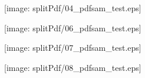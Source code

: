 \documentclass[portrait,a0c,final]{a0poster}
\newenvironment{poster}{
  \begin{center}
  \begin{minipage}[c]{0.99\textwidth}
}{
  \end{minipage} 
  \end{center}
}
\newenvironment{pcolumn}[1]{
  \begin{minipage}{#1\textwidth}
  \begin{center}
}{
  \end{center}
  \end{minipage}
}
\newcommand{\pbox}[4]{
\psshadowbox[#3]{
\begin{minipage}[t][#2][t]{#1}
#4
\end{minipage}
}}
\begin{document}
\begin{poster}
\begin{multicols}{2}
\begin{pcolumn}{0.5}
\texttt{[image: splitPdf/04\_pdfsam\_test.eps]}    
\end{pcolumn}

 \end{multicols}

 \begin{multicols}{3}

\begin{pcolumn}{0.33}
\texttt{[image: splitPdf/06\_pdfsam\_test.eps]}

\end{pcolumn}

\begin{pcolumn}{0.33}
\texttt{[image: splitPdf/07\_pdfsam\_test.eps]}
 
\end{pcolumn}

  \begin{pcolumn}{0.33}
 
\texttt{[image: splitPdf/08\_pdfsam\_test.eps]}
\end{pcolumn}
\end{multicols}

 \begin{multicols}{2}
  \begin{pcolumn}{0.5}
 

\end{pcolumn}
\end{multicols}
\end{poster}
\end{document}
